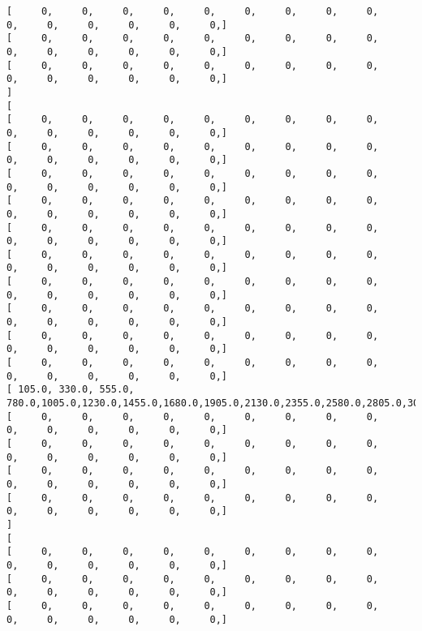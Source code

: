 \documentclass[11pt]{article}
\begin{document}
\begin{Verbatim}[commandchars=\\\{\}]
[      0,      0,      0,      0,      0,      0,      0,      0,      0,      0,      0,      0,      0,      0,      0, ]
[      0,      0,      0,      0,      0,      0,      0,      0,      0,      0,      0,      0,      0,      0,      0, ]
[      0,      0,      0,      0,      0,      0,      0,      0,      0,      0,      0,      0,      0,      0,      0, ]
]
[
[      0,      0,      0,      0,      0,      0,      0,      0,      0,      0,      0,      0,      0,      0,      0, ]
[      0,      0,      0,      0,      0,      0,      0,      0,      0,      0,      0,      0,      0,      0,      0, ]
[      0,      0,      0,      0,      0,      0,      0,      0,      0,      0,      0,      0,      0,      0,      0, ]
[      0,      0,      0,      0,      0,      0,      0,      0,      0,      0,      0,      0,      0,      0,      0, ]
[      0,      0,      0,      0,      0,      0,      0,      0,      0,      0,      0,      0,      0,      0,      0, ]
[      0,      0,      0,      0,      0,      0,      0,      0,      0,      0,      0,      0,      0,      0,      0, ]
[      0,      0,      0,      0,      0,      0,      0,      0,      0,      0,      0,      0,      0,      0,      0, ]
[      0,      0,      0,      0,      0,      0,      0,      0,      0,      0,      0,      0,      0,      0,      0, ]
[      0,      0,      0,      0,      0,      0,      0,      0,      0,      0,      0,      0,      0,      0,      0, ]
[      0,      0,      0,      0,      0,      0,      0,      0,      0,      0,      0,      0,      0,      0,      0, ]
[  105.0,  330.0,  555.0,  780.0, 1005.0, 1230.0, 1455.0, 1680.0, 1905.0, 2130.0, 2355.0, 2580.0, 2805.0, 3030.0, 3255.0, ]
[      0,      0,      0,      0,      0,      0,      0,      0,      0,      0,      0,      0,      0,      0,      0, ]
[      0,      0,      0,      0,      0,      0,      0,      0,      0,      0,      0,      0,      0,      0,      0, ]
[      0,      0,      0,      0,      0,      0,      0,      0,      0,      0,      0,      0,      0,      0,      0, ]
[      0,      0,      0,      0,      0,      0,      0,      0,      0,      0,      0,      0,      0,      0,      0, ]
]
[
[      0,      0,      0,      0,      0,      0,      0,      0,      0,      0,      0,      0,      0,      0,      0, ]
[      0,      0,      0,      0,      0,      0,      0,      0,      0,      0,      0,      0,      0,      0,      0, ]
[      0,      0,      0,      0,      0,      0,      0,      0,      0,      0,      0,      0,      0,      0,      0, ]

\end{Verbatim}
\end{document}
